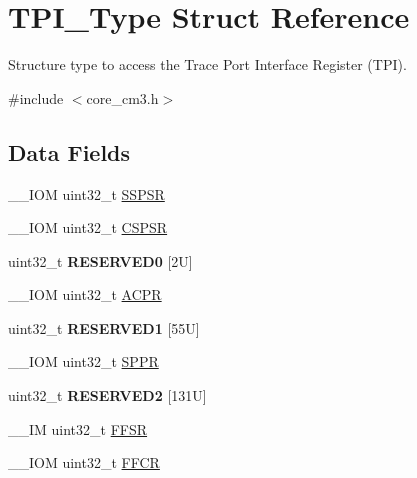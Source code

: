 \hypertarget{struct_t_p_i___type}{}\section{T\+P\+I\+\_\+\+Type Struct Reference}
\label{struct_t_p_i___type}


Structure type to access the Trace Port Interface Register (T\+PI).  




{\ttfamily \#include $<$core\+\_\+cm3.\+h$>$}

\subsection*{Data Fields}
\begin{DoxyCompactItemize}
\item 
\+\_\+\+\_\+\+I\+OM uint32\+\_\+t \mbox{\hyperlink{struct_t_p_i___type_a1aa8bba158b6ac122676301f17a362d9}{S\+S\+P\+SR}}
\item 
\+\_\+\+\_\+\+I\+OM uint32\+\_\+t \mbox{\hyperlink{struct_t_p_i___type_abf4a378b17278d98d2a5f9315fce7a5e}{C\+S\+P\+SR}}
\item 
\mbox{\label{struct_t_p_i___type_aa57754b8f88bb376d184aaf6fe74f391}} 
uint32\+\_\+t {\bfseries R\+E\+S\+E\+R\+V\+E\+D0} \mbox{[}2\+U\mbox{]}
\item 
\+\_\+\+\_\+\+I\+OM uint32\+\_\+t \mbox{\hyperlink{struct_t_p_i___type_a49a770cf0b7ec970f919f8ac22634fff}{A\+C\+PR}}
\item 
\mbox{\label{struct_t_p_i___type_a4d91e8d0f8791a2d137be359e6ca669f}} 
uint32\+\_\+t {\bfseries R\+E\+S\+E\+R\+V\+E\+D1} \mbox{[}55\+U\mbox{]}
\item 
\+\_\+\+\_\+\+I\+OM uint32\+\_\+t \mbox{\hyperlink{struct_t_p_i___type_ae9673e1acb75a46ed9852fd7a557cb7d}{S\+P\+PR}}
\item 
\mbox{\label{struct_t_p_i___type_ad34dc93fd7d41ef2c3365292cc8a178d}} 
uint32\+\_\+t {\bfseries R\+E\+S\+E\+R\+V\+E\+D2} \mbox{[}131\+U\mbox{]}
\item 
\+\_\+\+\_\+\+IM uint32\+\_\+t \mbox{\hyperlink{struct_t_p_i___type_a2a049b49e9da6772d38166397ce8fc70}{F\+F\+SR}}
\item 
\+\_\+\+\_\+\+I\+OM uint32\+\_\+t \mbox{\hyperlink{struct_t_p_i___type_afe3ca1410c32188d26be24c4ee9e180c}{F\+F\+CR}}

\end{DoxyCompactItemize}
